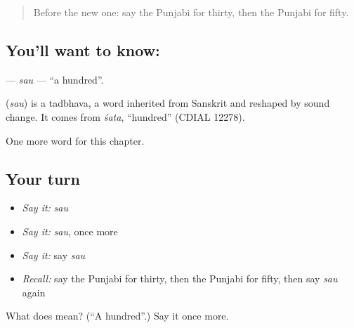 \begin{quote}
Before the new one: say the Punjabi for thirty, then the Punjabi for fifty.
\end{quote}

\subsection*{You'll want to know: }
\textbf{} — \emph{sau} — \textquotedblleft{}a hundred\textquotedblright{}.

\begin{cousinweb}
\textbf{} (\emph{sau}) is a tadbhava, a word inherited from Sanskrit and reshaped by sound change. It comes from \emph{śata}, \textquotedblleft{}hundred\textquotedblright{} (CDIAL 12278).
\end{cousinweb}

\begin{grammarlens}[title={What you've built}]
One more word for this chapter.
\end{grammarlens}

\subsection*{Your turn}
\begin{itemize}
\raggedright
  \item \emph{Say it:} \emph{sau}
  \item \emph{Say it:} \emph{sau}, once more
  \item \emph{Say it:} say \emph{sau}
  \item \emph{Recall:} say the Punjabi for thirty, then the Punjabi for fifty, then say \emph{sau} again
\end{itemize}

\begin{tcolorbox}[breakable,colback=teal!4,colframe=teal!35!black,title={Before you move on}]
What does  mean? (\textquotedblleft{}A hundred\textquotedblright{}.) Say it once more.
\end{tcolorbox}
